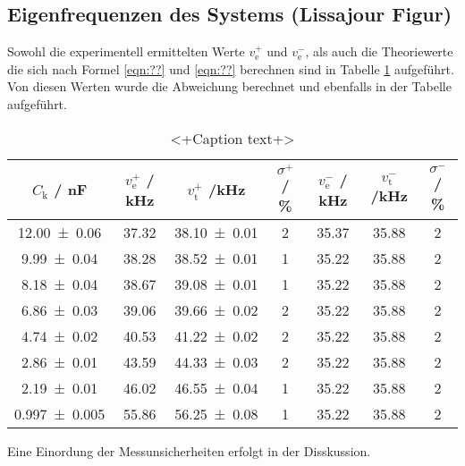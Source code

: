 \subsection{Eigenfrequenzen des Systems (Lissajour Figur)}
Sowohl die experimentell ermittelten Werte $v_\text{e}^+$ und  $v_\text{e}^-$, als auch die Theoriewerte die sich nach Formel \ref{eqn:??} und \ref{eqn:??} berechnen sind in Tabelle \ref{tab:eigen} aufgeführt. Von diesen Werten wurde die Abweichung berechnet und ebenfalls in der Tabelle aufgeführt.
\begin{table}
  \centering
  \begin{tabular}{c c c c c c c}
    \toprule
    $C_\text{k}$ / nF & $v_\text{e}^+$ / kHz & $v_\text{t}^+$ /kHz & $\sigma^+$ / \% & $v_\text{e}^-$ / kHz & $v_\text{t}^-$ /kHz & $\sigma^-$ / \%  \\
    \midrule
    \num{12.00 +- 0.06}	& 37.32	& \num{38.10 +- 0.01} & 2 & 35.37 & 35.88 & 2 \\
    \num{9.99 +- 0.04}	& 38.28	& \num{38.52 +- 0.01} & 1 & 35.22 & 35.88 & 2 \\
    \num{8.18 +- 0.04}	& 38.67 & \num{39.08 +- 0.01} & 1 & 35.22 & 35.88 & 2 \\
    \num{6.86 +- 0.03}	& 39.06 & \num{39.66 +- 0.02} & 2 & 35.22 & 35.88 & 2 \\
    \num{4.74 +- 0.02}	& 40.53 & \num{41.22 +- 0.02} & 2 & 35.22 & 35.88 & 2 \\
    \num{2.86 +- 0.01}	& 43.59 & \num{44.33 +- 0.03} & 2 & 35.22 & 35.88 & 2 \\
    \num{2.19 +- 0.01}	& 46.02 & \num{46.55 +- 0.04} & 1 & 35.22 & 35.88 & 2 \\
    \num{0.997 +- 0.005}	& 55.86 & \num{56.25 +- 0.08} & 1 & 35.22 & 35.88 & 2 \\
    \bottomrule
  \end{tabular}
  \caption{<+Caption text+>}
  \label{tab:eigen}
\end{table}
Eine Einordung der Messunsicherheiten erfolgt in der Disskussion.
